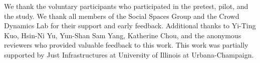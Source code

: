\begin{acks}
We thank the voluntary participants who participated in the pretest, pilot, and the study. We thank all members of the Social Spaces Group and the Crowd Dynamics Lab for their support and early feedback. Additional thanks to Yi-Ting Kuo, Hsin-Ni Yu, Yun-Shan Sam Yang, Katherine Chou, and the anonymous reviewers who provided valuable feedback to this work. This work was partially supported by Just Infrastructures at University of Illinois at Urbana-Champaign.
\end{acks}



